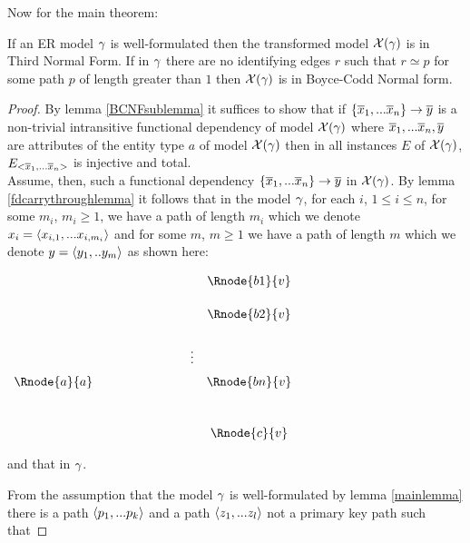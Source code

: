 \noindent Now for the main theorem:\\
\begin{theorem}
\noindent If an ER model $\gamma$ is well-formulated  then the 
transformed model $\mathcal{X}(\gamma)$  is in Third Normal Form. If in $\gamma$
there are no identifying edges $r$ such that $r \simeq p$ for some path $p$ of length greater than $1$
then $\mathcal{X}(\gamma)$ is in Boyce-Codd Normal form.
\end{theorem}
\begin{proof}
By lemma \ref{BCNFsublemma} it suffices to show that if 
$\left\{\overline{x}_1,...\overline{x}_n\right\} \rightarrow \overline{y}$ is a non-trivial intransitive functional dependency of model $\mathcal{X}(\gamma)$
where $\overline{x}_1,...\overline{x}_n,\overline{y}$ are attributes of the entity type $a$ of model $\mathcal{X}(\gamma)$ 
then  in all instances
$E$ of $\mathcal{X}(\gamma)$, $E_{<\overline{x}_1,...\overline{x}_n>}$ is injective and total. \\


\noindent Assume, then, such a functional dependency $\left\{\overline{x}_1,...\overline{x}_n\right\} \rightarrow \overline{y}$ in  $\mathcal{X}(\gamma)$. 
By lemma \ref{fdcarrythroughlemma} it follows that in the model $\gamma$, for each $i$, $1 \leq i \leq n$, 
for some $m_i$, $m_i \geq 1$, we have a 
path of length $m_i$ which we denote $x_i = \langle x_{i,1},...x_{i,m_i} \rangle$  and for some $m$, $m \geq 1$ we have a path 
of length $m$ which we denote 
$y=\langle y_1,..y_m \rangle$ as shown here: 
\setlength{\arraycolsep}{.2cm}
\begin{center}
$
\begin{array}{cp{2cm}cc}
             & &         & \Rnode{b1}{v} \\ [0.5cm]
						 & &         & \Rnode{b2}{v} \\ [0.6cm]
						 & & \vdots  &                 \\ [0.2cm]
\Rnode{a}{a} & &         & \Rnode{bn}{v} \\ [1.0cm]
             & &         & \Rnode{c}{v}   \\
\end{array}
$
\end{center}
and that  in $\gamma$.

From the assumption that the model $\gamma$ is well-formulated 
by lemma \ref{mainlemma} there is a path $\langle p_1,...p_k\rangle$
and a path $\langle z_1,...z_l\rangle$ not a primary key path such that


\end{proof}
